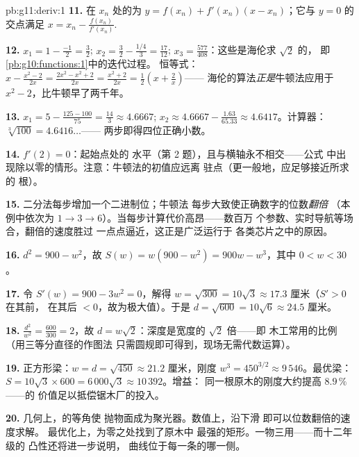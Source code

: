\begin{solution}{pb:g11:deriv:1}
\textbf{11.} 在 $x_n$ 处的为
$y = f(x_n) + f'(x_n)(x - x_n)$；它与 $y = 0$ 的交点满足
$x = x_n - \frac{f(x_n)}{f'(x_n)}$.

\textbf{12.} $x_1 = 1 - \frac{-1}{2} = \frac32$;
$x_2 = \frac32 - \frac{1/4}{3} = \frac{17}{12}$;
$x_3 = \frac{577}{408}$：这些是海伦求 $\sqrt2$ 的，
即\cref{pb:g10:functions:1}中的迭代过程。
恒等式：$x - \frac{x^2 - 2}{2x} = \frac{2x^2 - x^2 + 2}{2x}
= \frac{x^2 + 2}{2x} = \frac12\left(x + \frac2x\right)$——
海伦的算法\emph{正是}牛顿法应用于
$x^2 - 2$，比牛顿早了两千年。

\textbf{13.} $x_1 = 5 - \frac{125 - 100}{75} = \frac{14}{3}
\approx 4.6667$; $x_2 \approx 4.6667 - \frac{1.63}{65.33}
\approx 4.6417$。计算器：$\sqrt[3]{100} = 4.6416\ldots$——
两步即得四位正确小数。

\textbf{14.} $f'(2) = 0$：起始点处的
水平（第 2 题），且与横轴永不相交——公式
中出现除以零的情形。注意：牛顿法的初值应远离
驻点（更一般地，应足够接近所求的
根）。

\textbf{15.} 二分法每步增加一个二进制位；牛顿法
每步大致使正确数字的位数\emph{翻倍}
（本例中依次为 $1 \to 3 \to 6$）。当每步计算代价高昂——数百万
个参数、实时导航等场合，翻倍的速度胜过
一点点逼近，这正是广泛运行于
各类芯片之中的原因。

\textbf{16.} $d^2 = 900 - w^2$，故
$S(w) = w(900 - w^2) = 900w - w^3$，其中 $0 < w < 30$。

\textbf{17.} 令 $S'(w) = 900 - 3w^2 = 0$，解得
$w = \sqrt{300} = 10\sqrt3 \approx 17.3$ 厘米（$S' > 0$ 在其前，
在其后 $< 0$，故为极大值）。于是
$d = \sqrt{600} = 10\sqrt6 \approx 24.5$ 厘米。

\textbf{18.} $\frac{d^2}{w^2} = \frac{600}{300} = 2$，故
$d = w\sqrt2$：深度是宽度的 $\sqrt2$ 倍——即
木工常用的比例（用三等分直径的作图法
只需圆规即可得到，现场无需代数运算）。

\textbf{19.} 正方形梁：$w = d = \sqrt{450} \approx 21.2$
厘米，刚度 $w^3 = 450^{3/2} \approx 9\,546$。最优梁：
$S = 10\sqrt3 \times 600 = 6\,000\sqrt3 \approx 10\,392$。增益：
同一根原木的刚度大约提高 $8.9\,\%$——的
价值足以抵偿锯木厂的投入。

\textbf{20.} 几何上，的等角使
抛物面成为聚光器。数值上，沿下滑
即可以位数翻倍的速度求解。
最优化上，为零之处找到了原木中
最强的矩形。一物三用——而十二年级的
凸性还将进一步说明，
曲线位于每一条的哪一侧。
\end{solution}
